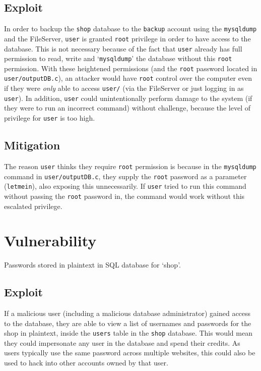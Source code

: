 \documentclass[11pt]{article}
\begin{document}
\subsection{Exploit}

In order to backup the \texttt{shop} database to the \texttt{backup} account using the \texttt{mysqldump} and the FileServer, \texttt{user} is granted \texttt{root} privilege in order to have access to the database. This is not necessary because of the fact that \texttt{user} already has full permission to read, write and `\texttt{mysqldump}' the database  without this \texttt{root} permission. With these heightened permissions (and the \texttt{root} password located in \texttt{user/outputDB.c}), an attacker would have \texttt{root} control over the computer even if they were \textit{only} able to access \texttt{user/} (via the FileServer or just logging in as \texttt{user}). In addition, \texttt{user} could unintentionally perform damage to the system (if they were to run an incorrect command) without challenge, because the level of privilege for \texttt{user} is too high.

\subsection{Mitigation}

The reason \texttt{user} thinks they require \texttt{root} permission is because in the \texttt{mysqldump} command in \texttt{user/outputDB.c}, they supply the \texttt{root} password as a parameter (\texttt{letmein}), also exposing this unnecessarily. If \texttt{user} tried to run this command without passing the \texttt{root} password in, the command would work without this escalated privilege.

\section{Vulnerability}

Passwords stored in plaintext in SQL database for `shop'.

\subsection{Exploit}

If a malicious user (including a malicious database administrator) gained access to the database, they are able to view a list of usernames and passwords for the shop in plaintext, inside the \texttt{users} table in the \texttt{shop} database. This would mean they could impersonate any user in the database and spend their credits. As users typically use the same password across multiple websites, this could also be used to hack into other accounts owned by that user.
\end{document}
